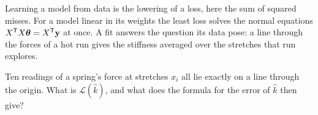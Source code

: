\begin{keyidea}
Learning a model from data is the lowering of a loss, here the sum of
squared misses. For a model linear in its weights the least loss solves
the normal equations $X^{\mathsf T}X\boldsymbol{\theta} = X^{\mathsf T}\bm{\mathrm{y}}$ at
once. A fit answers the question its data pose: a line through the forces
of a hot run gives the stiffness averaged over the stretches that run
explores.
\end{keyidea}


\begin{selfcheck}
Ten readings of a spring's force at stretches $x_i$ all lie exactly on a
line through the origin. What is $\mathcal{L}(\hat k)$, and what does the formula
for the error of $\hat k$ then give?
\end{selfcheck}
